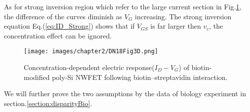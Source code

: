 As for strong inversion region which refer to the large current section in Fig.\ref{fig:DN17Fig6d}, the difference of the curves diminish as $V_G$ increasing.
The strong inversion equation Eq.(\ref{eq:ID_Strong}) shows that if $V_{GS}$ is far larger then $v_c$, the concentration effect can be ignored.

\begin{figure}[!htbp]
    \centering
    \texttt{[image: images/chapter2/DN18Fig3D.png]}
    \caption{Concentration-dependent electric response($I_D-V_G$) of biotin-modified poly-Si NWFET following biotin–streptavidin interaction.\cite{DN17}}
    \label{fig:DN17Fig6d}
\end{figure}

We will further prove the two assumptions by the data of biology experiment in section.\ref{section:disparityBio}.









%
